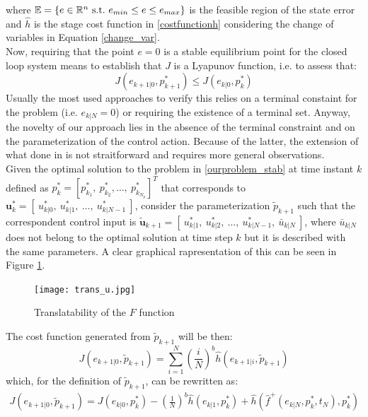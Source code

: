 where $\mathbb{E} = \lbrace {e}\in \mathbb{R}^n\ \textnormal{s.t.}\ {e}_{min}\leq e\leq e_{max} \rbrace$ is the feasible region of the state error and $\hat{h}$ is the stage cost function in \ref{costfunctionh} considering the change of variables in Equation \ref{change_var}. \\
Now, requiring that the point $e=0$ is a stable equilibrium point for the closed loop system means to establish that $J$ is a Lyapunov function, i.e. to assess that: 
\begin{equation}
	J({e}_{k+1|0},p^*_{k+1}) \leq J({e}_{k|0},p^*_k)
	\label{lyap_stab}
\end{equation}
Usually the most used approaches to verify this relies on a terminal constaint for the problem (i.e. $e_{k|N}=0$) or requiring the existence of a terminal set.
Anyway, the novelty of our approach lies in the absence of the terminal constraint and on the parameterization of the control action. Because of the latter, the extension of what done in \cite{alamir2018stability} is not straitforward and requires more general observations. \\
Given the optimal solution to the problem in \ref{ourproblem_stab} at time instant $k$ defined as $p_k^*=\left[ p_{k_1}^*,\ p_{k_2}^*,  \dots,\ p_{k_{N_p}}^* \right]^T$ that corresponds to $  \textbf{u}_k^*=[\ u_{k|0}^*,\ u_{k|1}^*,\  \dots,\  u_{k|{N-1}}^*\ ]$, consider the parameterization $\tilde{p}_{k+1}$ such that the correspondent control input is $  \tilde{\textbf{u}}_{k+1}=[\ u_{k|1}^*,\ u_{k|2}^*,\  \dots,\  u_{k|{N-1}}^*,\ \bar{u}_{k|N} \ ]$, where $\bar{u}_{k|N}$ does not belong to the optimal solution at time step $k$ but it is described with the same parameters. A clear graphical rapresentation of this can be seen in Figure \ref{param_translatability}.
\begin{figure}[h!]
	\centering
	\texttt{[image: trans\_u.jpg]}
	\caption{Translatability of the $F$ function}
	\label{param_translatability}
\end{figure}
The cost function generated from $\tilde{p}_{k+1}$ will be then:
\begin{equation}
	J({e}_{k+1|0},\tilde{p}_{k+1})=\sum_{i=1}^{N}\left(\frac{i}{N}\right)^b\hat{h}(e_{k+1|i},\tilde{p}_{k+1})
\end{equation}
which, for the definition of $\tilde{p}_{k+1}$, can be rewritten as:
\begin{equation}
\begin{split}
	J({e}_{k+1|0},\tilde{p}_{k+1})=J({e}_{k|0},p^*_k) -\left( \frac{1}{N} \right)^b\hat{h}(e_{k|1},p^*_{k}) + \hat{h}(\hat{f}^+(e_{k|N},p^*_k,t_N),p^*_k) \\
\end{split}
\end{equation}
